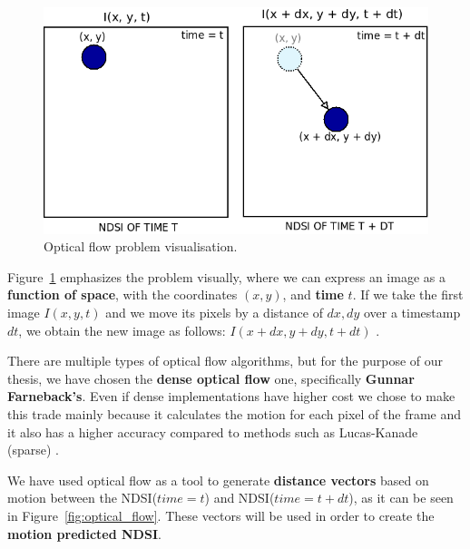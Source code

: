 \documentclass[12pt, a4paper]{report}
\begin{document}
	\begin{figure}[h]
		\centering
		\includegraphics[scale=0.6]{../images/optical_flow_schema.png}
		\caption{Optical flow problem visualisation.}
		\label{fig:optical_flow_example}
	\end{figure}
	
	\par Figure~\ref{fig:optical_flow_example} emphasizes the problem visually, where we can express an image as a \textbf{function of space}, with the coordinates \textbf{\((x, y)\)}, and \textbf{time} \textbf{\(t\)}. If we take the first image\textbf{ \(I(x, y, t)\)} and we move its pixels by a distance of \textbf{\(dx, dy\)} over a timestamp \textbf{\(dt\)}, we obtain the new image as follows: \textbf{\(I(x + dx, y + dy, t + dt)\)} \cite{orb}.
	
	\par There are multiple types of optical flow algorithms, but for the purpose of our thesis, we have chosen the \textbf{dense optical flow} one, specifically \textbf{Gunnar Farneback's}. Even if dense implementations have higher cost we chose to make this trade mainly because it calculates the motion for each pixel of the frame and it also has a higher accuracy \cite{orb} compared to methods such as Lucas-Kanade (sparse) \cite{lukas}.
	
	\par We have used optical flow as a tool to generate \textbf{distance vectors} based on motion between the NDSI(\(time=t\)) and NDSI(\(time=t + dt\)), as it can be seen in Figure~\ref{fig:optical_flow}. These vectors will be used in order to create the \textbf{motion predicted NDSI}. 
	
\end{document}

